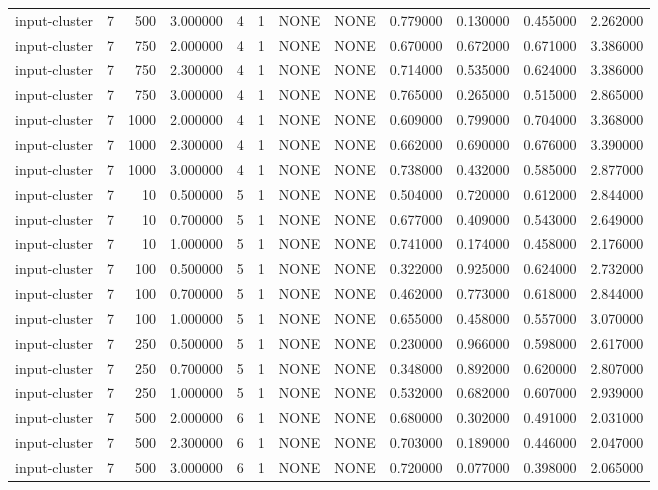 \begin{tabular}{lrrrllllrrrr}
input-cluster & 7 & 500 & 3.000000 & 4 & 1 & NONE & NONE & 0.779000 & 0.130000 & 0.455000 & 2.262000 \\
input-cluster & 7 & 750 & 2.000000 & 4 & 1 & NONE & NONE & 0.670000 & 0.672000 & 0.671000 & 3.386000 \\
input-cluster & 7 & 750 & 2.300000 & 4 & 1 & NONE & NONE & 0.714000 & 0.535000 & 0.624000 & 3.386000 \\
input-cluster & 7 & 750 & 3.000000 & 4 & 1 & NONE & NONE & 0.765000 & 0.265000 & 0.515000 & 2.865000 \\
input-cluster & 7 & 1000 & 2.000000 & 4 & 1 & NONE & NONE & 0.609000 & 0.799000 & 0.704000 & 3.368000 \\
input-cluster & 7 & 1000 & 2.300000 & 4 & 1 & NONE & NONE & 0.662000 & 0.690000 & 0.676000 & 3.390000 \\
input-cluster & 7 & 1000 & 3.000000 & 4 & 1 & NONE & NONE & 0.738000 & 0.432000 & 0.585000 & 2.877000 \\
input-cluster & 7 & 10 & 0.500000 & 5 & 1 & NONE & NONE & 0.504000 & 0.720000 & 0.612000 & 2.844000 \\
input-cluster & 7 & 10 & 0.700000 & 5 & 1 & NONE & NONE & 0.677000 & 0.409000 & 0.543000 & 2.649000 \\
input-cluster & 7 & 10 & 1.000000 & 5 & 1 & NONE & NONE & 0.741000 & 0.174000 & 0.458000 & 2.176000 \\
input-cluster & 7 & 100 & 0.500000 & 5 & 1 & NONE & NONE & 0.322000 & 0.925000 & 0.624000 & 2.732000 \\
input-cluster & 7 & 100 & 0.700000 & 5 & 1 & NONE & NONE & 0.462000 & 0.773000 & 0.618000 & 2.844000 \\
input-cluster & 7 & 100 & 1.000000 & 5 & 1 & NONE & NONE & 0.655000 & 0.458000 & 0.557000 & 3.070000 \\
input-cluster & 7 & 250 & 0.500000 & 5 & 1 & NONE & NONE & 0.230000 & 0.966000 & 0.598000 & 2.617000 \\
input-cluster & 7 & 250 & 0.700000 & 5 & 1 & NONE & NONE & 0.348000 & 0.892000 & 0.620000 & 2.807000 \\
input-cluster & 7 & 250 & 1.000000 & 5 & 1 & NONE & NONE & 0.532000 & 0.682000 & 0.607000 & 2.939000 \\
input-cluster & 7 & 500 & 2.000000 & 6 & 1 & NONE & NONE & 0.680000 & 0.302000 & 0.491000 & 2.031000 \\
input-cluster & 7 & 500 & 2.300000 & 6 & 1 & NONE & NONE & 0.703000 & 0.189000 & 0.446000 & 2.047000 \\
input-cluster & 7 & 500 & 3.000000 & 6 & 1 & NONE & NONE & 0.720000 & 0.077000 & 0.398000 & 2.065000 \\

\end{tabular}
